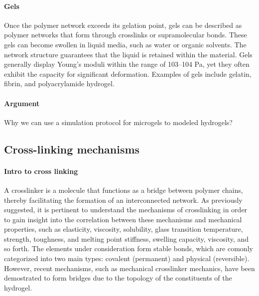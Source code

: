 \paragraph{Gels} Once the polymer network exceeds its gelation point, gels can be described as polymer networks that form through crosslinks or supramolecular bonds. 
These gels can become swollen in liquid media, such as water or organic solvents.
The network structure guarantees that the liquid is retained within the material.
Gels generally display Young's moduli within the range of 103–104 Pa, yet they often exhibit the capacity for significant deformation.
Examples of gels include gelatin, fibrin, and polyacrylamide hydrogel\citep{guPolymerNetworksPlastics2020}.



\paragraph{Argument} Why we can use a simulation protocol for microgels to modeled hydrogels?




\subsection{Cross-linking mechanisms}

\paragraph{Intro to cross linking}
A crosslinker is a molecule that functions as a bridge between polymer chains, thereby facilitating the formation of an interconnected network.
As previously suggested, it is pertinent to understand the mechanisms of crosslinking in order to gain insight into the correlation between these mechanisms and mechanical properties, such as elasticity, viscosity, solubility, glass transition temperature, strength, toughness, and melting point stiffness, swelling capacity, viscosity, and so forth\citep{priyaComprehensiveReviewHydrogel2024}.
The elements under consideration form stable bonds, which are comonly categorized into two main types: covalent (permanent) and physical (reversible)\citep{bustamantetorresHydrogelsClassificationAccording2021}.
However, recent mechanisms, such as mechanical crosslinker mechanics, have been demostrated to form bridges due to the topology of the constituents of the hydrogel.

